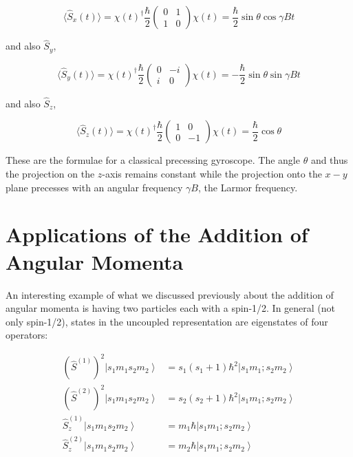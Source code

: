 \[
\langle \hat{S}_x(t)\rangle = \chi(t)^\dagger \frac{\hbar}{2} \begin{pmatrix}
  0 & 1 \\ 1 & 0
\end{pmatrix} \chi(t) = \frac{\hbar}{2}\sin \theta \cos \gamma B t
\] \vspace{3px}

and also $\hat{S}_y$, 

\[
\langle \hat{S}_y(t) \rangle = \chi(t)^\dagger \frac{\hbar}{2} \begin{pmatrix}
  0 & -i \\ i & 0 
\end{pmatrix} \chi(t) = -\frac{\hbar}{2}\sin\theta \sin \gamma Bt
\] \vspace{3px}

and also $\hat{S}_z$, 

\[
\langle \hat{S}_z(t) \rangle = \chi(t)^\dagger \frac{\hbar}{2} \begin{pmatrix}
  1 & 0 \\ 0 & -1
\end{pmatrix} \chi(t) = \frac{\hbar}{2} \cos \theta
\] \vspace{3px}

These are the formulae for a classical precessing gyroscope. The angle $\theta$
and thus the projection on the $z$-axis remains constant while the projection
onto the $x-y$ plane precesses with an angular frequency $\gamma B$, the Larmor
frequency. 

\section{Applications of the Addition of Angular Momenta}

An interesting example of what we discussed previously about the addition of
angular momenta is having two particles each with a spin-1/2. In general (not
only spin-1/2), states in the uncoupled representation are eigenstates of four
operators: 


\begin{align*}
(\hat{S}^{(1)})^2 \left| s_1 m_1 s_2 m_2 \right\rangle &= s_1(s_1 + 1)\hbar^2 \left| s_1 m_1; s_2 m_2 \right\rangle \\
(\hat{S}^{(2)})^2 \left| s_1 m_1 s_2 m_2 \right\rangle &= s_2(s_2 + 1)\hbar^2 \left| s_1 m_1; s_2 m_2 \right\rangle \\
\hat{S}^{(1)}_z \left| s_1 m_1 s_2 m_2 \right\rangle &= m_1\hbar \left| s_1 m_1; s_2 m_2 \right\rangle \\
\hat{S}^{(2)}_z \left| s_1 m_1 s_2 m_2 \right\rangle &= m_2\hbar \left| s_1 m_1; s_2 m_2 \right\rangle
\end{align*}


